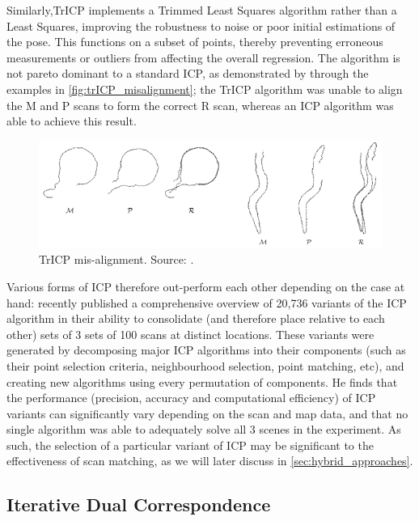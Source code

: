 \documentclass[authoryearcitations]{UoYCSproject}
\begin{document}
Similarly,TrICP \cite{Chetverikov2005-yz} implements a Trimmed Least Squares \cite{Ruppert1980-js} algorithm rather than a Least Squares, improving the robustness to noise or poor initial estimations of the pose. This functions on a subset of points, thereby preventing erroneous measurements or outliers from affecting the overall regression. The algorithm is not pareto dominant to a standard ICP, as demonstrated by \citeauthor{Chetverikov2005-yz} through the examples in \autoref{fig:trICP_misalignment}; the TrICP algorithm was unable to align the M and P scans to form the correct R scan, whereas an ICP algorithm was able to achieve this result. 


\begin{figure}[t]
	\centering
	\includegraphics[width=\textwidth,keepaspectratio]{images/trICP_misalignment.png}
	\caption[TrICP mis-alignment]{TrICP mis-alignment. Source: \citet{Chetverikov2005-yz}.}
	\label{fig:trICP_misalignment}
\end{figure}

Various forms of ICP therefore out-perform each other depending on the case at hand: \citet{Donoso2017-wp} recently published a comprehensive overview of 20,736 variants of the ICP algorithm in their ability to consolidate (and therefore place relative to each other) sets of 3 sets of 100 scans at distinct locations. These variants were generated by decomposing major ICP algorithms into their components (such as their point selection criteria, neighbourhood selection, point matching, etc), and creating new algorithms using every permutation of components. He finds that the performance (precision, accuracy and computational efficiency) of ICP variants can significantly vary depending on the scan and map data, and that no single algorithm was able to adequately solve all 3 scenes in the experiment. As such, the selection of a particular variant of ICP may be significant to the effectiveness of scan matching, as we will later discuss in \ref{sec:hybrid_approaches}.


\subsection{Iterative Dual Correspondence}
\end{document}

